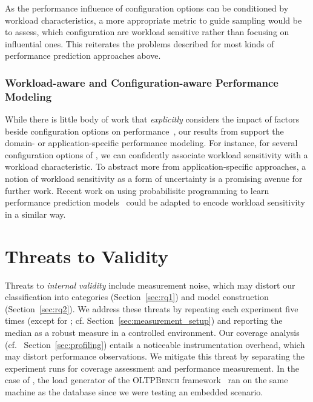 {{{\begin{table}
\end{table}
}
As the performance influence of configuration options can be conditioned by workload characteristics, a more appropriate metric to guide sampling would be to assess, which configuration are workload sensitive rather than focusing on influential ones. This reiterates the problems described for most kinds of performance prediction approaches above.

\subsubsection{Workload-aware and Configuration-aware Performance Modeling} While there is little body of work that \textit{explicitly} considers the impact of factors beside configuration options on performance~\cite{koc_satune_2021}, our results from  support the domain- or application-specific performance modeling. For instance, for several configuration options of \jumper, we can confidently associate workload sensitivity with a workload characteristic. To abstract more from application-specific approaches, a notion of workload sensitivity as a form of uncertainty is a promising avenue for further work. Recent work on using probabilisitc programming to learn performance prediction models~\cite{dorn2020} could be adapted to encode workload sensitivity in a similar way.


\section{Threats to Validity}\label{sec:threats}
\color{black}
Threats to \textit{internal validity} include measurement noise, 
which may distort our classification into categories (Section~\ref{sec:rq1}) and model construction (Section~\ref{sec:rq2}). We address these threats by repeating each experiment five times  (except for \htwo; cf. Section~\ref{sec:measurement_setup}) and reporting the median as a robust measure in a controlled environment. Our coverage analysis (cf.~ Section~\ref{sec:profiling}) entails a noticeable instrumentation overhead, which may distort performance observations. We mitigate this threat by separating the experiment runs for coverage assessment and performance measurement. In the case of \htwo, the load generator of the \textsc{OLTPBench} framework~\cite{difallah_oltp_2013} ran on the same machine as the database since we were testing an embedded scenario. 	
	
}}
